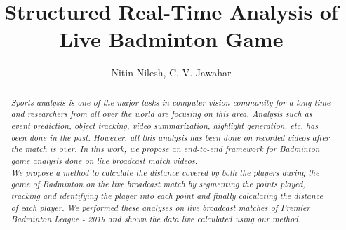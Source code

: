 \documentclass[runningheads,a4paper]{llncs}
\begin{document}
\mainmatter  %

\title{Structured Real-Time Analysis of Live Badminton Game}


%
%
\author{Nitin Nilesh, C. V. Jawahar}
%


%
%

\maketitle


\begin{abstract}
\emph{Sports analysis is one of the major tasks in computer vision community for a long time and researchers from all over the world are focusing on this area. Analysis such as event prediction, object tracking, video summarization, highlight generation, etc. has been done in the past. However, all this analysis has been done on recorded videos after the match is over. In this work, we propose an end-to-end framework for Badminton game analysis done on live broadcast match videos.\\
We propose a method to calculate the distance covered by both the players during the game of Badminton on the live broadcast match by segmenting the points played, tracking and identifying the player into each point and finally calculating the distance of each player. We performed these analyses on live broadcast matches of Premier Badminton League - 2019 and shown the data live calculated using our method.}
\end{abstract}
\end{document}
